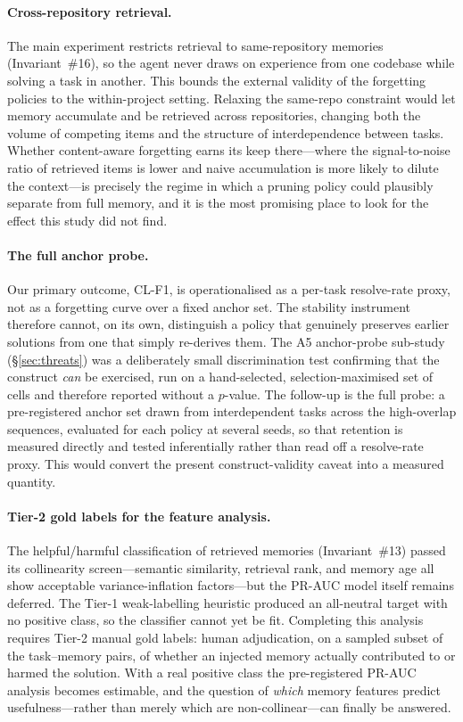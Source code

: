 \paragraph{Cross-repository retrieval.}
The main experiment restricts retrieval to same-repository memories (Invariant~\#16), so the agent never draws on experience from one codebase while solving a task in another. This bounds the external validity of the forgetting policies to the within-project setting. Relaxing the same-repo constraint would let memory accumulate and be retrieved across repositories, changing both the volume of competing items and the structure of interdependence between tasks. Whether content-aware forgetting earns its keep there---where the signal-to-noise ratio of retrieved items is lower and naive accumulation is more likely to dilute the context---is precisely the regime in which a pruning policy could plausibly separate from full memory, and it is the most promising place to look for the effect this study did not find.

\paragraph{The full anchor probe.}
Our primary outcome, CL-F1, is operationalised as a per-task resolve-rate proxy, not as a forgetting curve over a fixed anchor set. The stability instrument therefore cannot, on its own, distinguish a policy that genuinely preserves earlier solutions from one that simply re-derives them. The A5 anchor-probe sub-study (\S\ref{sec:threats}) was a deliberately small discrimination test confirming that the construct \emph{can} be exercised, run on a hand-selected, selection-maximised set of cells and therefore reported without a $p$-value. The follow-up is the full probe: a pre-registered anchor set drawn from interdependent tasks across the high-overlap sequences, evaluated for each policy at several seeds, so that retention is measured directly and tested inferentially rather than read off a resolve-rate proxy. This would convert the present construct-validity caveat into a measured quantity.

\paragraph{Tier-2 gold labels for the feature analysis.}
The helpful/harmful classification of retrieved memories (Invariant~\#13) passed its collinearity screen---semantic similarity, retrieval rank, and memory age all show acceptable variance-inflation factors---but the PR-AUC model itself remains deferred. The Tier-1 weak-labelling heuristic produced an all-neutral target with no positive class, so the classifier cannot yet be fit. Completing this analysis requires Tier-2 manual gold labels: human adjudication, on a sampled subset of the task--memory pairs, of whether an injected memory actually contributed to or harmed the solution. With a real positive class the pre-registered PR-AUC analysis becomes estimable, and the question of \emph{which} memory features predict usefulness---rather than merely which are non-collinear---can finally be answered.

